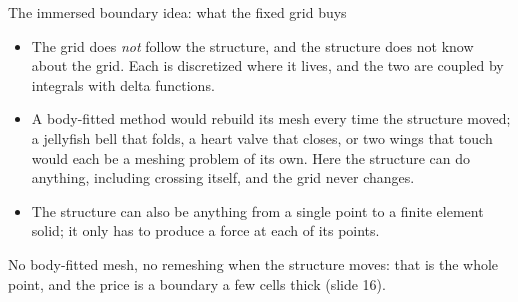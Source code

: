 \documentclass[aspectratio=169,11pt]{beamer}
\begin{document}
\begin{frame}{The immersed boundary idea: what the fixed grid buys}
\begin{itemize}
  \item The grid does \emph{not} follow the structure, and the structure does not know about the grid. Each is discretized where it lives, and the two are coupled by integrals with delta functions.
  \item A body-fitted method would rebuild its mesh every time the structure moved; a jellyfish bell that folds, a heart valve that closes, or two wings that touch would each be a meshing problem of its own. Here the structure can do anything, including crossing itself, and the grid never changes.
  \item The structure can also be anything from a single point to a finite element solid; it only has to produce a force at each of its points.
\end{itemize}
\vspace{2mm}
\begin{punchbox}
\small No body-fitted mesh, no remeshing when the structure moves: that is the whole point, and the price is a boundary a few cells thick (slide 16).
\end{punchbox}
\end{frame}
\end{document}
